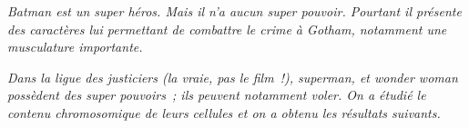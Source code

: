 \documentclass{Controle}
\begin{document}
  \nom

  \emph{Batman est un super héros. Mais il n'a aucun super pouvoir. Pourtant il présente des caractères lui permettant de combattre le crime à Gotham, notamment une musculature importante.}


  \emph{Dans la ligue des justiciers (la vraie, pas le film !), superman, et wonder woman possèdent  des super pouvoirs ; ils peuvent notamment voler. On a étudié le contenu chromosomique de leurs cellules et on a obtenu les résultats suivants.}
\end{document}
